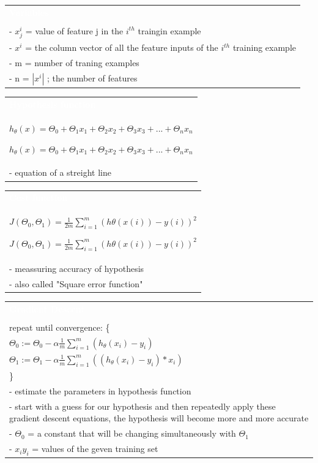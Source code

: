 \documentclass[a4paper,12pt,ngerman,fleqn]{article}
\newcommand{\mybox}[3]{
        \centering
        \begin{tabularx}{0.9\textwidth}{|X|}
            \rowcolor{accent}
            \rule{0pt}{20pt}
            \textcolor{white}{\textbf{#1}} \\
            \def\temp{#2}\ifx\temp\empty
                
            \else
                #2 \\ \hline
            \fi
            #3
            \\ \hline
        \end{tabularx}
    }
\begin{document}
    \begin{minipage}[t]{.51\textwidth}
        \vspace{1pt}
        \mybox
            {Variables}
            {}
            {
                - \(x_{j}^i\) = value of feature j in the \(i^{th}\) traingin example \\
                - \(x^i\) = the column vector of all the feature inputs of the \(i^{th}\) training example \\
                - m = number of traning examples \\
                - n = \(|x^i|\) ; the number of features
            }
        \newline
        \newline
        \newline
        \mybox
            {Hypothesis function}
            {\( h_{\theta}(x) = \Theta_{0} + \Theta_{1}x_{1} + \Theta_{2}x_{2} + \Theta_{3}x_{3} + ... + \Theta_{n}x_{n} \)}
            {
                - equation of a streight line
            }
        \newline
        \newline
        \newline
        \mybox
            {Cost function}
            {\( J(\Theta_{0}, \Theta_{1}) = \frac{1}{2m} \sum\limits_{i=1}^{m} (h\theta(x{(i)}) - y{(i)})^2 \)}
            {
                - meassuring accuracy of hypothesis \\
                - also called "Square error function"
            }
        \newline
        \newline
        \newline
        \mybox
            {Gradient Descent}  
            {} 
            {
                repeat until convergence: \{ \\
                \( \Theta_{0} := \Theta_{0} - \alpha \frac{1}{m} \sum\limits_{i=1}^{m} (h_\theta(x_{i}) - y_{i}) \) \\
                \( \Theta_{1} := \Theta_{1} - \alpha \frac{1}{m} \sum\limits_{i=1}^{m} ((h_\theta(x_{i}) - y_{i}) * x_{i} ) \) \\
                \} \\ \hline 
                - estimate the parameters in hypothesis function \\
                - start with a guess for our hypothesis and then repeatedly apply these gradient descent equations, the hypothesis will become more and more accurate \\
                - \( \Theta_0 \) = a constant that will be changing simultaneously with \( \Theta_1 \) \\
                - \( x_i y _i \) = values of the geven training set
            }
        \newline
    \end{minipage}%
\end{document}

